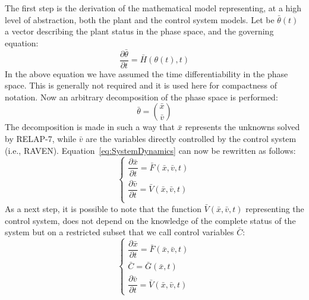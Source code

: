 \documentclass{mc2013}
\begin{document}
\label{sec:PlantControlModel}
The first step is the derivation of the mathematical model representing, at a high level of abstraction, both 
the plant and the control system models. Let be $\bar{\theta}(t)$ a vector describing the plant status in the phase space, and the governing equation:
\begin{equation}
\frac{\partial \bar{\theta}}{\partial t} = \bar{H}(\theta(t),t)
\label{eq:SystemDynamics}
\end{equation}
In the above equation we have assumed the time differentiability in the phase space. This is generally
not required and it is used here for compactness of notation. Now an arbitrary decomposition of the
phase space is performed:
\begin{equation}
\bar{\theta}=\binom{\bar{x}}{\bar{v}}
\label{eq:firstDecomposition}
\end{equation}
The decomposition is made in such a way that $\bar{x}$ represents the unknowns solved by RELAP-7, while $\bar{v}$ are the variables directly controlled by the control system (i.e., RAVEN). Equation~\ref{eq:SystemDynamics} can now be rewritten as follows:
\begin{equation}
\begin{cases} 
\dfrac{\partial \bar{x}}{\partial t} = \bar{F}(\bar{x},\bar{v},t) \\ 
\dfrac{\partial \bar{v}}{\partial t} = \bar{V}(\bar{x},\bar{v},t) \\
\end{cases}
\label{eq:generalSystemEquation}
\end{equation}
As a next step, it is possible to note that the function 
$\bar{V}(\bar{x},\bar{v},t)$ 
representing the control system, does not depend on the knowledge of the complete status of the system but on a restricted subset that we call control variables $\bar{C}$:
\begin{equation}
\begin{cases} 
\dfrac{\partial \bar{x}}{\partial t} = \bar{F}(\bar{x},\bar{v},t) \\
\bar{C} = \bar{G}(\bar{x},t) \\ 
\dfrac{\partial \bar{v}}{\partial t} = \bar{V}(\bar{x},\bar{v},t) 
\end{cases}
\label{eq:generalSystemEquationwithControl}
\end{equation}

\end{document}
